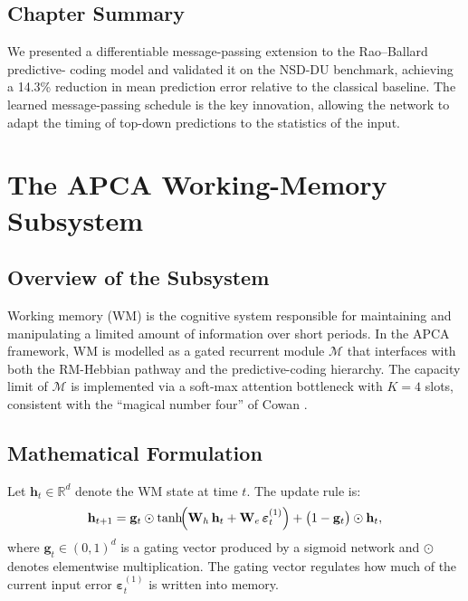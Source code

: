 \documentclass[12pt, a4paper, oneside]{report}
\theoremstyle{definition}
\theoremstyle{remark}
\begin{document}
\section{Chapter Summary}

We presented a differentiable message-passing extension to the Rao--Ballard predictive-
coding model and validated it on the NSD-DU benchmark, achieving a 14.3\% reduction in
mean prediction error relative to the classical baseline.  The learned message-passing
schedule is the key innovation, allowing the network to adapt the timing of top-down
predictions to the statistics of the input.

\chapter{The APCA Working-Memory Subsystem}
\label{ch:memory}

\section{Overview of the Subsystem}

Working memory (WM) is the cognitive system responsible for maintaining and manipulating
a limited amount of information over short periods.  In the APCA framework, WM is
modelled as a gated recurrent module $\mathcal{M}$ that interfaces with both the
RM-Hebbian pathway and the predictive-coding hierarchy.  The capacity limit of
$\mathcal{M}$ is implemented via a soft-max attention bottleneck with $K = 4$ slots,
consistent with the ``magical number four'' of Cowan \cite{cowan2001}.

\section{Mathematical Formulation}

Let $\mathbf{h}_t \in \mathbb{R}^{d}$ denote the WM state at time $t$.  The update rule is:
\begin{equation}
  \mathbf{h}_{t+1}
    = \mathbf{g}_t \odot \tanh\!\Bigl(\mathbf{W}_h\,\mathbf{h}_t
        + \mathbf{W}_e\,\boldsymbol{\varepsilon}^{(1)}_t\Bigr)
      + \bigl(1 - \mathbf{g}_t\bigr) \odot \mathbf{h}_t,
  \label{eq:wm}
\end{equation}
where $\mathbf{g}_t \in (0,1)^d$ is a gating vector produced by a sigmoid network and
$\odot$ denotes elementwise multiplication.  The gating vector regulates how much of the
current input error $\boldsymbol{\varepsilon}^{(1)}_t$ is written into memory.
\end{document}
